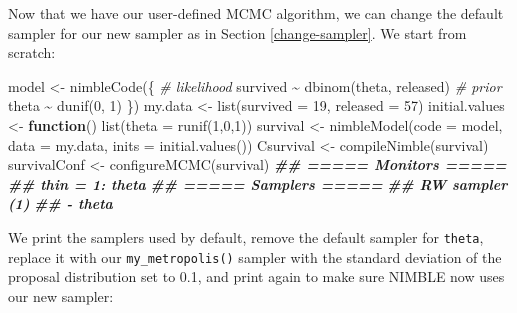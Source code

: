 \documentclass[
  12pt,
]{krantz}
\newenvironment{Shaded}{\begin{snugshade}}{\end{snugshade}}
\newcommand{\AttributeTok}[1]{\textcolor[rgb]{0.77,0.63,0.00}{#1}}
\newcommand{\CommentTok}[1]{\textcolor[rgb]{0.56,0.35,0.01}{\textit{#1}}}
\newcommand{\ControlFlowTok}[1]{\textcolor[rgb]{0.13,0.29,0.53}{\textbf{#1}}}
\newcommand{\DecValTok}[1]{\textcolor[rgb]{0.00,0.00,0.81}{#1}}
\newcommand{\DocumentationTok}[1]{\textcolor[rgb]{0.56,0.35,0.01}{\textbf{\textit{#1}}}}
\newcommand{\FunctionTok}[1]{\textcolor[rgb]{0.00,0.00,0.00}{#1}}
\newcommand{\NormalTok}[1]{#1}
\newcommand{\OtherTok}[1]{\textcolor[rgb]{0.56,0.35,0.01}{#1}}
\newcommand{\SpecialCharTok}[1]{\textcolor[rgb]{0.00,0.00,0.00}{#1}}
\begin{document}
Now that we have our user-defined MCMC algorithm, we can change the default sampler for our new sampler as in Section \ref{change-sampler}. We start from scratch:

\begin{Shaded}
\begin{Highlighting}[]
\NormalTok{model }\OtherTok{\textless{}{-}} \FunctionTok{nimbleCode}\NormalTok{(\{}
  \CommentTok{\# likelihood}
\NormalTok{  survived }\SpecialCharTok{\textasciitilde{}} \FunctionTok{dbinom}\NormalTok{(theta, released)}
  \CommentTok{\# prior}
\NormalTok{  theta }\SpecialCharTok{\textasciitilde{}} \FunctionTok{dunif}\NormalTok{(}\DecValTok{0}\NormalTok{, }\DecValTok{1}\NormalTok{)}
\NormalTok{\})}
\NormalTok{my.data }\OtherTok{\textless{}{-}} \FunctionTok{list}\NormalTok{(}\AttributeTok{survived =} \DecValTok{19}\NormalTok{, }\AttributeTok{released =} \DecValTok{57}\NormalTok{)}
\NormalTok{initial.values }\OtherTok{\textless{}{-}} \ControlFlowTok{function}\NormalTok{() }\FunctionTok{list}\NormalTok{(}\AttributeTok{theta =} \FunctionTok{runif}\NormalTok{(}\DecValTok{1}\NormalTok{,}\DecValTok{0}\NormalTok{,}\DecValTok{1}\NormalTok{))}
\NormalTok{survival }\OtherTok{\textless{}{-}} \FunctionTok{nimbleModel}\NormalTok{(}\AttributeTok{code =}\NormalTok{ model, }
                        \AttributeTok{data =}\NormalTok{ my.data, }
                        \AttributeTok{inits =} \FunctionTok{initial.values}\NormalTok{())}
\NormalTok{Csurvival }\OtherTok{\textless{}{-}} \FunctionTok{compileNimble}\NormalTok{(survival)}
\NormalTok{survivalConf }\OtherTok{\textless{}{-}} \FunctionTok{configureMCMC}\NormalTok{(survival)}
\DocumentationTok{\#\# ===== Monitors =====}
\DocumentationTok{\#\# thin = 1: theta}
\DocumentationTok{\#\# ===== Samplers =====}
\DocumentationTok{\#\# RW sampler (1)}
\DocumentationTok{\#\#   {-} theta}
\end{Highlighting}
\end{Shaded}

We print the samplers used by default, remove the default sampler for \texttt{theta}, replace it with our \texttt{my\_metropolis()} sampler with the standard deviation of the proposal distribution set to 0.1, and print again to make sure NIMBLE now uses our new sampler:
\end{document}
